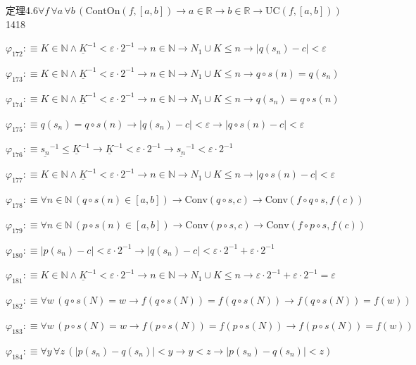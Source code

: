 \begin{fullproof}{定理4.6}{$\forall f\,\forall a\,\forall b\,(\mathrm{ContOn}(f,[a,b]) \to a \in \mathbb{R} \to b \in \mathbb{R} \to \mathrm{UC}(f,[a,b]))$}{1418}
\begin{abbrevlist}
\item $\varphi_{172} :\equiv K \in \mathbb{N} \land \underline{K}^{-1} < \varepsilon \cdot 2^{-1} \to n \in \mathbb{N} \to N_{1} \cup K \leq n \to \lvert q(s_{n}) - c \rvert < \varepsilon$
\item $\varphi_{173} :\equiv K \in \mathbb{N} \land \underline{K}^{-1} < \varepsilon \cdot 2^{-1} \to n \in \mathbb{N} \to N_{1} \cup K \leq n \to q \circ s(n) = q(s_{n})$
\item $\varphi_{174} :\equiv K \in \mathbb{N} \land \underline{K}^{-1} < \varepsilon \cdot 2^{-1} \to n \in \mathbb{N} \to N_{1} \cup K \leq n \to q(s_{n}) = q \circ s(n)$
\item $\varphi_{175} :\equiv q(s_{n}) = q \circ s(n) \to \lvert q(s_{n}) - c \rvert < \varepsilon \to \lvert q \circ s(n) - c \rvert < \varepsilon$
\item $\varphi_{176} :\equiv \underline{s_{n}}^{-1} \leq \underline{K}^{-1} \to \underline{K}^{-1} < \varepsilon \cdot 2^{-1} \to \underline{s_{n}}^{-1} < \varepsilon \cdot 2^{-1}$
\item $\varphi_{177} :\equiv K \in \mathbb{N} \land \underline{K}^{-1} < \varepsilon \cdot 2^{-1} \to n \in \mathbb{N} \to N_{1} \cup K \leq n \to \lvert q \circ s(n) - c \rvert < \varepsilon$
\item $\varphi_{178} :\equiv \forall n \in \mathbb{N}\,(q \circ s(n) \in [a,b]) \to \mathrm{Conv}(q \circ s,c) \to \mathrm{Conv}(f \circ q \circ s,f(c))$
\item $\varphi_{179} :\equiv \forall n \in \mathbb{N}\,(p \circ s(n) \in [a,b]) \to \mathrm{Conv}(p \circ s,c) \to \mathrm{Conv}(f \circ p \circ s,f(c))$
\item $\varphi_{180} :\equiv \lvert p(s_{n}) - c \rvert < \varepsilon \cdot 2^{-1} \to \lvert q(s_{n}) - c \rvert < \varepsilon \cdot 2^{-1} + \varepsilon \cdot 2^{-1}$
\item $\varphi_{181} :\equiv K \in \mathbb{N} \land \underline{K}^{-1} < \varepsilon \cdot 2^{-1} \to n \in \mathbb{N} \to N_{1} \cup K \leq n \to \varepsilon \cdot 2^{-1} + \varepsilon \cdot 2^{-1} = \varepsilon$
\item $\varphi_{182} :\equiv \forall w\,(q \circ s(N) = w \to f(q \circ s(N)) = f(q \circ s(N)) \to f(q \circ s(N)) = f(w))$
\item $\varphi_{183} :\equiv \forall w\,(p \circ s(N) = w \to f(p \circ s(N)) = f(p \circ s(N)) \to f(p \circ s(N)) = f(w))$
\item $\varphi_{184} :\equiv \forall y\,\forall z\,(\lvert p(s_{n}) - q(s_{n}) \rvert < y \to y < z \to \lvert p(s_{n}) - q(s_{n}) \rvert < z)$

\end{abbrevlist}
\end{fullproof}
